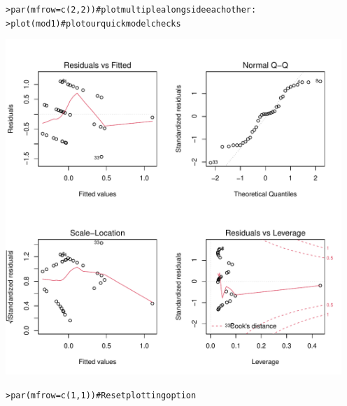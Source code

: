 \documentclass[12pt]{article}\usepackage[]{graphicx}\usepackage[]{color}
\makeatletter
\newcommand{\hlnum}[1]{\textcolor[rgb]{0.82,0.78,0.62}{#1}}%
\newcommand{\hlcom}[1]{\textcolor[rgb]{0.404,0.408,0.42}{#1}}%
\newcommand{\hlstd}[1]{\textcolor[rgb]{0.882,0.878,0.898}{#1}}%
\newcommand{\hlkwc}[1]{\textcolor[rgb]{0.812,0.522,0.388}{#1}}%
\newcommand{\hlkwd}[1]{\textcolor[rgb]{0.733,0.388,0.812}{#1}}%
\newenvironment{kframe}{%
 \def\at@end@of@kframe{}%
 \ifinner\ifhmode%
  \def\at@end@of@kframe{\end{minipage}}%
  \begin{minipage}{\columnwidth}%
 \fi\fi%
 \def\FrameCommand##1{\hskip\@totalleftmargin \hskip-\fboxsep
 \colorbox{shadecolor}{##1}\hskip-\fboxsep
     \hskip-\linewidth \hskip-\@totalleftmargin \hskip\columnwidth}%
 \MakeFramed {\advance\hsize-\width
   \@totalleftmargin\z@ \linewidth\hsize
   \@setminipage}}%
 {\par\unskip\endMakeFramed%
 \at@end@of@kframe}
\newenvironment{knitrout}{}{} %
\makeatother
\begin{document}
\begin{flushleft}
\begin{center}
\begin{knitrout}
\color{fgcolor}\begin{kframe}
\begin{alltt}
\hlstd{> }\hlkwd{par}\hlstd{(}\hlkwc{mfrow}\hlstd{=}\hlkwd{c}\hlstd{(}\hlnum{2}\hlstd{,}\hlnum{2}\hlstd{))} \hlcom{# plot multiple alongside each other:}
\hlstd{> }\hlkwd{plot}\hlstd{(mod1)}        \hlcom{# plot our quick model checks}
\end{alltt}
\end{kframe}
\includegraphics[width=5in]{figure/checkinglinear-1} 
\begin{kframe}\begin{alltt}
\hlstd{> }\hlkwd{par}\hlstd{(}\hlkwc{mfrow}\hlstd{=}\hlkwd{c}\hlstd{(}\hlnum{1}\hlstd{,}\hlnum{1}\hlstd{))} \hlcom{# Reset plotting option}
\end{alltt}
\end{kframe}
\end{knitrout}
\end{center}


\end{flushleft}
\end{document}
